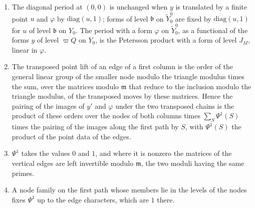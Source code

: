 \begin{lemma}\label{lem:first-point-data}
\begin{enumerate}[label=\textup{(\alph*)}]
\item The diagonal period at $(0,0)$ is unchanged when $y$ is translated by a finite point $u$ and $\varphi$ by $\mathrm{diag}(u,1)$; forms of level $\mathfrak b$ on $\tilde Y^0_0$ are fixed by $\mathrm{diag}(u,1)$ for $u$ of level $\mathfrak b$
on $Y_0$. The period with a form $\varphi$ on $\tilde Y^0_0$, as a functional of the forms $y$ of level $\varpi Q$ on $Y_0$, is the Petersson product with a form of level $J_M$, linear in $\varphi$.
\item The transposed point lift of an edge of a first column is the order of the general linear group of the smaller node modulo the triangle modulus times the sum, over the matrices modulo $\mathfrak m$ that reduce to
the inclusion modulo the triangle modulus, of the transposed moves by these matrices. Hence the pairing of the images of $y'$ and $\varphi$ under the two transposed chains is the product of these orders over the
nodes of both columns times $\sum_S\Psi^1(S)$ times the pairing of the images along the first path by $S$, with $\Psi^1(S)$ the product of the point data of the edges.
\item $\Psi^1$ takes the values $0$ and $1$, and where it is nonzero the matrices of the vertical edges are left invertible modulo $\mathfrak m$, the two moduli having the same primes.
\item A node family on the first path whose members lie in the levels of the nodes fixes $\Psi^1$ up to the edge characters, which are $1$ there.
\end{enumerate}
\end{lemma}

